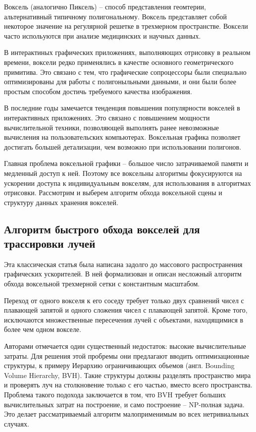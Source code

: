 Воксель (аналогично Пиксель) -- способ представления геомтерии, альтернативный типичному
полигональному. Воксель представляет собой некоторое значение на регулярной решетке в 
трехмерном пространстве. Воксели часто испольуются при анализе медицинских и научных
данных.

В интерактиных графических приложениях, выполняющих отрисовку в реальном времени, воксели 
редко применялись в качестве основного геометрического примитива. Это связано с тем, что
графические сопроцессоры были специально оптимизированы для работы с полигоныльными данными,
и они были более простым способом достичь требуемого качества изображения. 

В последние годы замечается тенденция повышения популярности вокселей в интерактивных приложениях.
Это связано с повышением мощности вычислительной техники, позволяющей выполнять ранее невозможные
вычисления на пользовательских компьютерах. Воксельная графика позволяет достигать большей детализации,
чем возможно при использовании полигонов. 

Главная проблема воксельной графики -- большое число затрачиваемой памяти и медленный доступ к ней.
Поэтому все воксельны алгоритмы фокусируются на ускорении доступа к индивидуальным вокселям, для
использования в алгоритмах отрисовки. Рассмотрим и выберем алгоритм обхода воксельной сцены и 
структуру данных хранения вокселей.

\subsection{Алгоритм быстрого обхода вокселей для трассировки лучей}
Эта классическая статья была написана задолго до массового распространения 
графических ускорителей. В ней формализован и описан несложный алгоритм обхода 
воксельной трехмерной сетки с константным масштабом.

Переход от одного вокселя к его соседу требует только двух сравнений чисел с плавающей запятой и 
одного сложения чисел с плавающей запятой. Кроме того, исключаются множественные пересечения лучей 
с объектами, находящимися в более чем одном вокселе. 
~\cite{AFVTAfRT}

Авторами отмечается один существенный недостаток: высокие вычислительные затраты. Для решения
этой пробремы они предлагают вводить оптимизационные структуры, к примеру Иерархию ограничивающих
объемов (англ. Bounding Volume Hierarchy, BVH). Такие структуры должны разделять пространство мира
и проверять луч на столкновение только с его частью, вместо всего пространства. Проблема такого 
подохода заключается в том, что BVH требует больших вычислительных затрат на построение, и
само построение -- NP-полная задача. Это делает рассматриваемый алгоритм малоприменимым во 
всех нетривиальных случаях.


